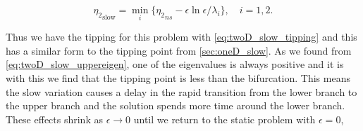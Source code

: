\begin{equation}\label{eq:twoD_slow_tipping}
{\eta_2}_{\text{slow}}= \min\limits_i\{{\eta_2}_{ns}-\epsilon\ln\epsilon/\lambda_i\},\quad i=1,2.
\end{equation}

Thus we have the tipping for this problem with \eqref{eq:twoD_slow_tipping} and this has a similar form to the tipping point from \autoref{sec:oneD_slow}. As we found from \eqref{eq:twoD_slow_uppereigen}, one of the eigenvalues is always positive and it is with this we find that the tipping point is less than the bifurcation. This means the slow variation causes a delay in the rapid transition from the lower branch to the upper branch and the solution spends more time around the lower branch. These effects shrink as $\epsilon\to 0$ until we return to the static problem with $\epsilon=0$,

